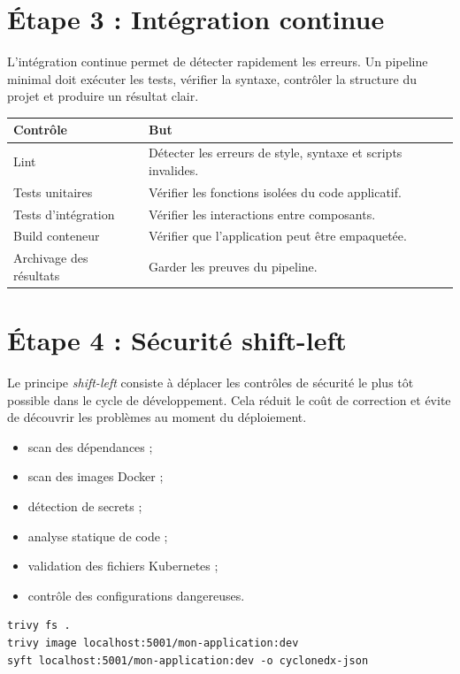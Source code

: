 \documentclass[12pt,a4paper]{article}
\begin{document}
\section{Étape 3 : Intégration continue}

L'intégration continue permet de détecter rapidement les erreurs. Un pipeline
minimal doit exécuter les tests, vérifier la syntaxe, contrôler la structure du
projet et produire un résultat clair.

\begin{longtable}{|p{5cm}|p{8cm}|}
\hline
\textbf{Contrôle} & \textbf{But} \\
\hline
Lint & Détecter les erreurs de style, syntaxe et scripts invalides. \\
\hline
Tests unitaires & Vérifier les fonctions isolées du code applicatif. \\
\hline
Tests d'intégration & Vérifier les interactions entre composants. \\
\hline
Build conteneur & Vérifier que l'application peut être empaquetée. \\
\hline
Archivage des résultats & Garder les preuves du pipeline. \\
\hline
\end{longtable}

\section{Étape 4 : Sécurité shift-left}

Le principe \textit{shift-left} consiste à déplacer les contrôles de sécurité le
plus tôt possible dans le cycle de développement. Cela réduit le coût de
correction et évite de découvrir les problèmes au moment du déploiement.

\begin{itemize}[leftmargin=*]
  \item scan des dépendances ;
  \item scan des images Docker ;
  \item détection de secrets ;
  \item analyse statique de code ;
  \item validation des fichiers Kubernetes ;
  \item contrôle des configurations dangereuses.
\end{itemize}

\begin{lstlisting}[style=shellstyle,caption={Exemples de contrôles sécurité}]
trivy fs .
trivy image localhost:5001/mon-application:dev
syft localhost:5001/mon-application:dev -o cyclonedx-json
\end{lstlisting}
\end{document}
